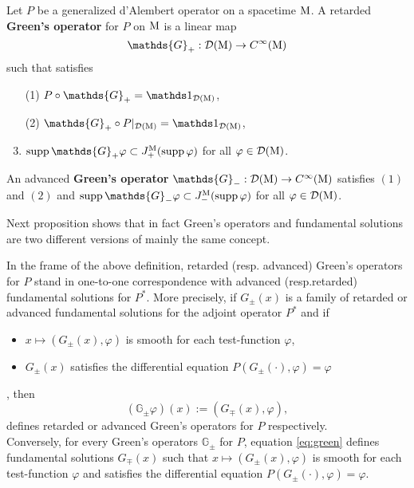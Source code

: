 \begin{definition}
	Let $P$ be a generalized d'Alembert operator on a spacetime $\mathrm{M}$. A retarded \textbf{Green's operator} for $P$ on $\mathrm{M}$ is a linear map
	\[	\mathds{G}_+:\mD(\mM)\to C^\infty(\mM)		\]
	such that satisfies
	\begin{enumerate}
		\item[(1)]	$P\circ \mathds{G}_+=\id_{\mD(\mM)}$,
		\item[(2)] $\mathds{G}_+\circ P|_{\mD(\mM)}=\id_{\mD(\mM)}$,
		\item $\supp\,\mathds{G}_+\varphi\subset J_+^\mM(\supp\,\varphi)$ for all $\varphi\in\mathcal{D}(\mathrm{M})$.
	\end{enumerate}
	An advanced \textbf{Green's operator} $\mathds{G}_-:\mD(\mM)\to C^\infty(\mM)$ satisfies $(1)$ and $(2)$ and $\supp\,\mathds{G}_-\varphi\subset J_-^\mM(\supp\,\varphi)$ for all $\varphi\in\mathcal{D}(\mathrm{M})$.
	\label{defn:green}
\end{definition}

\noindent Next proposition shows that in fact Green's operators and fundamental solutions are two different versions of mainly the same concept.




\begin{prop}
	In the frame of the above definition, retarded (resp. advanced) Green's operators for $P$ stand in one-to-one correspondence with advanced (resp.retarded) fundamental solutions for $P^*$. More precisely, if $G_\pm(x)$ is a family of retarded or advanced fundamental solutions for the adjoint operator $P^*$ and if 
	\begin{itemize}
		\item $x\mapsto(G_\pm(x),\varphi)$ is smooth for each test-function $\varphi$,
		\item $G_\pm(x)$ satisfies the differential equation $P(G_\pm(\cdot),\varphi) = \varphi$
	\end{itemize}, then 
	\begin{equation}
	(\mathds{G}_\pm\varphi)(x):=(G_\mp(x),\varphi),
	\label{eq:green}
	\end{equation}
	defines retarded or advanced Green's operators for $P$ respectively.\\ Conversely, for every Green's operators $\mathds{G}_\pm$ for $P$, equation \eqref{eq:green} defines fundamental solutions $G_\mp(x)$ such that $x\mapsto(G_\pm(x),\varphi)$ is smooth for each test-function $\varphi$ and satisfies the differential equation $P(G_\pm(\cdot),\varphi) = \varphi$.
\end{prop}









